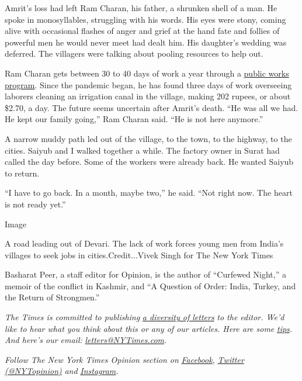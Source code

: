 Amrit's loss had left Ram Charan, his father, a shrunken shell of a man.
He spoke in monosyllables, struggling with his words. His eyes were
stony, coming alive with occasional flashes of anger and grief at the
hand fate and follies of powerful men he would never meet had dealt him.
His daughter's wedding was deferred. The villagers were talking about
pooling resources to help out.

Ram Charan gets between 30 to 40 days of work a year through a
\href{https://caravanmagazine.in/reportage/nregas-reality-check}{public
works program}. Since the pandemic began, he has found three days of
work overseeing laborers cleaning an irrigation canal in the village,
making 202 rupees, or about \$2.70, a day. The future seems uncertain
after Amrit's death. ``He was all we had. He kept our family going,''
Ram Charan said. ``He is not here anymore.''

A narrow muddy path led out of the village, to the town, to the highway,
to the cities. Saiyub and I walked together a while. The factory owner
in Surat had called the day before. Some of the workers were already
back. He wanted Saiyub to return.

``I have to go back. In a month, maybe two,'' he said. ``Not right now.
The heart is not ready yet.''

Image

A road leading out of Devari. The lack of work forces young men from
India's villages to seek jobs in cities.Credit...Vivek Singh for The New
York Times

Basharat Peer, a staff editor for Opinion, is the author of ``Curfewed
Night,'' a memoir of the conflict in Kashmir, and ``A Question of Order:
India, Turkey, and the Return of Strongmen.''

\emph{The Times is committed to publishing}
\href{https://www.nytimes3xbfgragh.onion/2019/01/31/opinion/letters/letters-to-editor-new-york-times-women.html}{\emph{a
diversity of letters}} \emph{to the editor. We'd like to hear what you
think about this or any of our articles. Here are some}
\href{https://help.nytimes3xbfgragh.onion/hc/en-us/articles/115014925288-How-to-submit-a-letter-to-the-editor}{\emph{tips}}\emph{.
And here's our email:}
\href{mailto:letters@NYTimes.com}{\emph{letters@NYTimes.com}}\emph{.}

\emph{Follow The New York Times Opinion section on}
\href{https://www.facebookcorewwwi.onion/nytopinion}{\emph{Facebook}}\emph{,}
\href{http://twitter.com/NYTOpinion}{\emph{Twitter (@NYTopinion)}}
\emph{and}
\href{https://www.instagram.com/nytopinion/}{\emph{Instagram}}\emph{.}

